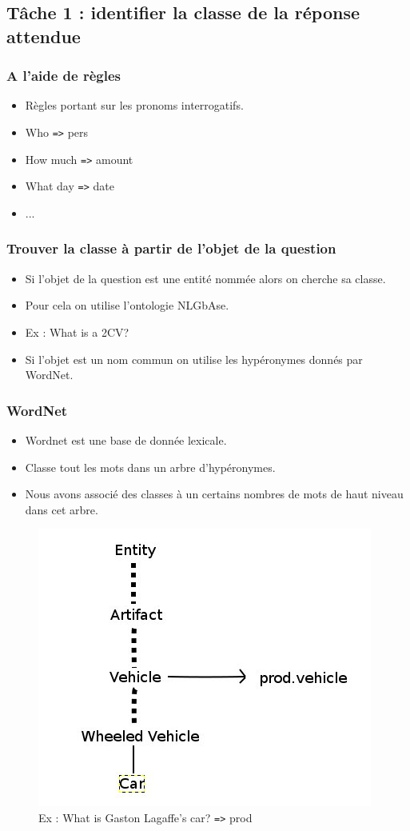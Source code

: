 \documentclass[xcolor=dvipsnames]{beamer}
\begin{document}
\subsection{Tâche 1 : identifier la classe de la réponse attendue}
\frame
{
    \frametitle{A l'aide de règles}
    \begin{itemize}
        \item<1-> Règles portant sur les pronoms interrogatifs.
        \item<2-> Who \texttt{=>} pers
        \item<3-> How much \texttt{=>} amount
        \item<4-> What day \texttt{=>} date
        \item<5-> ...
    \end{itemize}
}

\frame
{
    \frametitle{Trouver la classe à partir de l'objet de la question}
    \begin{itemize}
        \item<1-> Si l'objet de la question est une entité nommée alors on cherche sa classe. \\
        \item<2-> Pour cela on utilise l'ontologie NLGbAse.
        \item<3-> Ex : What is a 2CV?
        \item<4-> Si l'objet est un nom commun on utilise les hypéronymes donnés par WordNet.
    \end{itemize}
}

\frame 
{
    \frametitle{WordNet}
    \begin{itemize}
        \item<1-> Wordnet est une base de donnée lexicale.
        \item<2-> Classe tout les mots dans un arbre d'hypéronymes.
        \item<3-> Nous avons associé des classes à un certains nombres de mots de haut niveau dans cet arbre.
    \end{itemize}
    \begin{figure}
        \includegraphics[scale=0.30]{wordnet}
        \caption{Ex : What is Gaston Lagaffe's car? \texttt{=>} prod}
    \end{figure}
}
\end{document}
